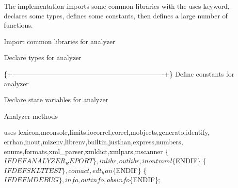 The implementation imports some common libraries with the {\Tt{}uses\nwendquote}
keyword, declares some types, defines some constants, then defines a
large number of functions.

\nwenddocs{}\endmoddef\nwstartdeflinemarkup{}\nwenddeflinemarkup
\LA{}Import common libraries for analyzer~{\nwtagstyle{}}\RA{}

\LA{}Declare types for analyzer~{\nwtagstyle{}}\RA{}

\{+-------------------------------------------------------------------+\}
\LA{}Define constants for analyzer~{\nwtagstyle{}}\RA{}

\LA{}Declare state variables for analyzer~{\nwtagstyle{}}\RA{}

\LA{}Analyzer methods~{\nwtagstyle{}}\RA{}
\nwendcode{}\nwdocspar

\nwenddocs{}\endmoddef\nwstartdeflinemarkup{}\nwenddeflinemarkup
uses lexicon,mconsole,limits,iocorrel,correl,mobjects,generato,identify,
     errhan,inout,mizenv,librenv,builtin,justhan,express,numbers,
     enums,formats,xml_parser,xmldict,xmlpars,mscanner
\{$IFDEF ANALYZER_REPORT\},inlibr,outlibr,inoutmml\{$ENDIF\}
\{$IFDEF SKLTTEST\},comact,edt_han\{$ENDIF\}
\{$IFDEF MDEBUG\},info,outinfo,absinfo\{$ENDIF\};
\nwendcode{}\nwdocspar

